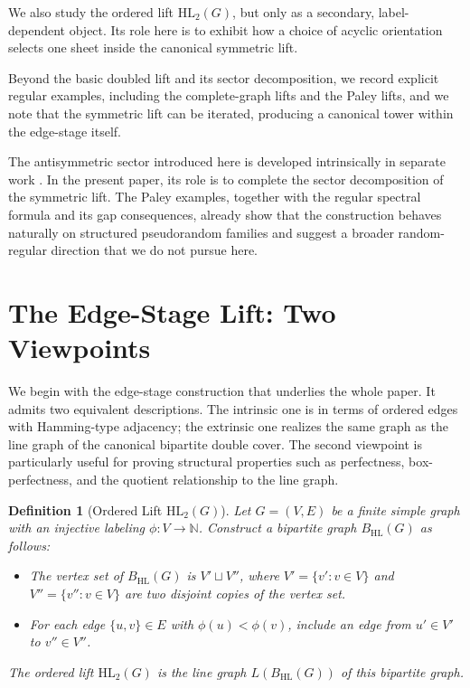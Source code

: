 \documentclass[11pt]{article}
\newtheorem{definition}{Definition}
\newcommand{\HL}{\mathrm{HL}}
\theoremstyle{plain}
\begin{document}
We also study the ordered lift \(\HL_2(G)\), but only as a secondary, label-dependent object. Its role here is
to exhibit how a choice of acyclic orientation selects one sheet inside the canonical symmetric lift.

Beyond the basic doubled lift and its sector decomposition, we record explicit regular examples, including the
complete-graph lifts and the Paley lifts, and we note that the symmetric lift can be iterated, producing a
canonical tower within the edge-stage itself.

The antisymmetric sector introduced here is developed intrinsically in separate work \cite{bal2026alg}. In the
present paper, its role is to complete the sector decomposition of the symmetric lift. The Paley examples,
together with the regular spectral formula and its gap consequences, already show that the construction behaves
naturally on structured pseudorandom families and suggest a broader random-regular direction that we do not
pursue here.

\section{The Edge-Stage Lift: Two Viewpoints}

We begin with the edge-stage construction that underlies the whole paper. It admits two equivalent
descriptions. The intrinsic one is in terms of ordered edges with Hamming-type adjacency; the extrinsic one
realizes the same graph as the line graph of the canonical bipartite double cover. The second viewpoint is
particularly useful for proving structural properties such as perfectness, box-perfectness, and the quotient
relationship to the line graph.


\begin{definition}[Ordered Lift \( \mathrm{HL}_2(G) \)]\label{def:ordered-lift}
Let \( G = (V, E) \) be a finite simple graph with an injective labeling \( \phi : V \to \mathbb{N} \). Construct a bipartite graph \( B_{\mathrm{HL}}(G) \) as follows:
\begin{itemize}
    \item The vertex set of \( B_{\mathrm{HL}}(G) \) is \( V' \sqcup V'' \), where \( V' = \{ v' : v \in V \} \) and \( V'' = \{ v'' : v \in V \} \) are two disjoint copies of the vertex set.
    \item For each edge \( \{u,v\} \in E \) with \( \phi(u) < \phi(v) \), include an edge from \( u' \in V' \) to \( v'' \in V'' \).
\end{itemize}
The ordered lift $\HL_2(G)$ is the line graph $L(B_{\HL}(G))$ of this bipartite graph.

\end{definition}
\end{document}
